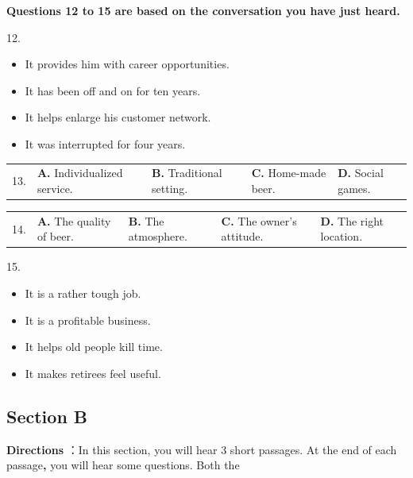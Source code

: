\documentclass[UTF8,11pt]{ctexart}
\begin{document}
\textbf{Questions 12 to 15 are based on the conversation you have just heard.}


12.


\begin{itemize}[leftmargin=2em,itemsep=.2em,topsep=.4em]\item[A.] It provides him with career opportunities.
\item[C.] It has been off and on for ten years.
\end{itemize}

\begin{itemize}[leftmargin=2em,itemsep=.2em,topsep=.4em]\item[B.] It helps enlarge his customer network.
\item[D.] It was interrupted for four years.
\end{itemize}

\noindent\begin{tabularx}{\linewidth}{@{}lXXXX@{}}13. & \textbf{A.} Individualized service. & \textbf{B.} Traditional setting. & \textbf{C.} Home-made beer. & \textbf{D.} Social games.\\\end{tabularx}\par

\noindent\begin{tabularx}{\linewidth}{@{}lXXXX@{}}14. & \textbf{A.} The quality of beer. & \textbf{B.} The atmosphere. & \textbf{C.} The owner’s attitude. & \textbf{D.} The right location.\\\end{tabularx}\par

15.


\begin{itemize}[leftmargin=2em,itemsep=.2em,topsep=.4em]\item[A.] It is a rather tough job.
\item[B.] It is a profitable business.
\item[C.] It helps old people kill time.
\item[D.] It makes retirees feel useful.
\end{itemize}

\subsection*{\textbf{Section B}}


\textbf{Directions} ：In this section, you will hear 3 short passages. At the end of each passage\textbf{,} you will hear some questions. Both the
\end{document}
